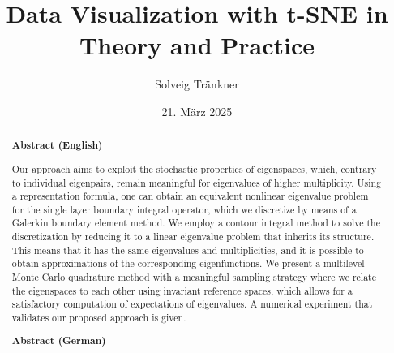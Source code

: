 \documentclass[paper=a4, fontsize=11pt, BCOR=13mm, DIV=13, headinclude, toc=index, toc=bibliography, english, twoside, parskip]{scrreprt}
\author{Solveig Tr\"ankner}
\date{21. M\"arz 2025}
\title{Data Visualization with t-SNE in Theory and Practice}
\theoremstyle{definition}               %
\theoremstyle{plain}
\begin{document}

\begin{abstract}
    \textbf{Abstract (English)}

    Our approach aims to exploit the stochastic properties of eigenspaces, which, contrary to individual eigenpairs, remain meaningful for eigenvalues of higher multiplicity.
    Using a representation formula, one can obtain an equivalent nonlinear eigenvalue problem for the single layer boundary integral operator, which we discretize by means of a Galerkin boundary element method.
    We employ a contour integral method to solve the discretization by reducing it to a linear eigenvalue problem that inherits its structure. This means that it has the same eigenvalues and multiplicities, and it is possible to obtain approximations of the corresponding eigenfunctions.
    We present a multilevel Monte Carlo quadrature method with a meaningful sampling strategy where we relate the eigenspaces to each other using invariant reference spaces, which allows for a satisfactory computation of expectations of eigenvalues.
    A numerical experiment that validates our proposed approach is given.


    \vspace{2em}
    \textbf{Abstract (German)}


\end{abstract}
\end{document}
